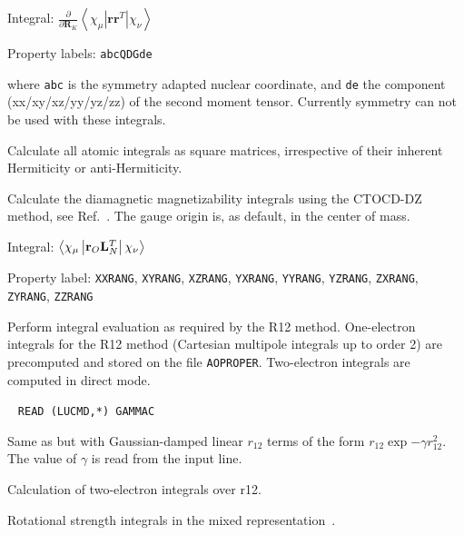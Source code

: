 \begin{description}
\begin{list}{}{}
\item Integral: $\frac{\partial}{\partial {\mathbf
R}_K}\left<\chi_{\mu}\left|{\mathbf r}{\mathbf r}^T\right|\chi_{\nu}\right>$ 
\item Property labels: \verb|abcQDGde|
\end{list}
where \verb|abc| is the symmetry adapted nuclear coordinate, and \verb|de| the
component (xx/xy/xz/yy/yz/zz) of the second moment tensor. Currently
symmetry can not be used with these integrals.

\item[\Key{QUASUM}] Calculate all atomic integrals as square
matrices, irrespective of their inherent Hermiticity or
anti-Hermiticity.

\item[\Key{RANGMO}] Calculate the diamagnetic magnetizability integrals using the CTOCD-DZ method,
 see Ref.~\cite{paololazz1,paololazz2}.
The gauge origin is, as default, in the center of mass. 

\begin{list}{}{}
\item Integral: $\left<\chi_{\mu}\left|{\bf
r}_O{\bf L}_{N}^{T}\right|\chi_{\nu}\right>$ 
\item Property label: \verb|XXRANG|, \verb|XYRANG|,
\verb|XZRANG|, \verb|YXRANG|, \verb|YYRANG|, \verb|YZRANG|, 
\verb|ZXRANG|, \verb|ZYRANG|, \verb|ZZRANG|
\end{list}

\item[\Key{R12}] Perform integral evaluation as required by the R12 method.
One-electron integrals for the R12 method (Cartesian multipole integrals up to order 2)
are precomputed and stored on the file \texttt{AOPROPER}. Two-electron integrals are
computed in direct mode.

\item[\Key{R12EXP}]\verb| |\newline
\verb|READ (LUCMD,*) GAMMAC|

Same as  but with Gaussian-damped linear $r_{12}$ terms of
the form $r_{12}\exp{-\gamma r_{12}^2}$. The value of $\gamma$ is read from the input line.

\item[\Key{R12INT}] Calculation of two-electron integrals over r12.

\item[\Key{ROTSTR}] Rotational strength integrals in the mixed
representation~\cite{tbphkkrjcp110}.


\end{description}
